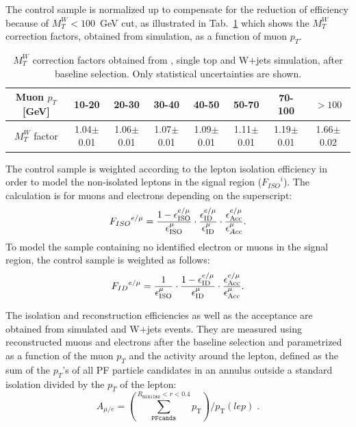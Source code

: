 The control sample is normalized up to compensate for the reduction of efficiency because of $M_{T}^{W}<100$~GeV cut, as illustrated in Tab.~\ref{tab:mtw} which shows the $M_{T}^{W}$ correction factors, obtained from simulation, as a function of muon $p_{T}$. 

\begin{table}[htbp]
\fontsize{10 pt}{1.2 em}
\caption{$M_{T}^{W}$ correction factors obtained from \ttbar, single top and W$+$jets simulation, after baseline selection. Only statistical uncertainties are shown.}
\begin{center}
\begin{tabular}{|c|c|c|c|c|c|c|c|}
\hline
\specialcell{Muon \\ $p_T$ [GeV]} & 10-20 & 20-30 & 30-40 & 40-50 & 50-70 & 70-100 & $>100$ \\
\hline
\specialcell{$M_{T}^{W}$ \\ factor} & 1.04$\pm$0.01 & 1.06$\pm$0.01 & 1.07$\pm$0.01 & 1.09$\pm$0.01 & 1.11$\pm$0.01 & 1.19$\pm$0.01 & 1.66$\pm$0.02 \\
\hline
\end{tabular}
\end{center}
\label{tab:mtw}
\end{table}

The control sample is weighted according to the lepton isolation efficiency in order to model the non-isolated leptons in the signal region (${F_{ISO}}^{i}$). 
The calculation is for muons and electrons depending on the superscript:
\begin{equation}
{F_{ISO}}^{e/\mu} =  \frac{1-\epsilon_{\rm ISO}^{e/\mu}}{\epsilon_{\rm ISO}^{\mu}} \cdot \frac{\epsilon^{e/\mu}_{\rm ID}}{\epsilon^{\mu}_{\rm ID}} \cdot \frac{\epsilon^{e/\mu}_{\rm Acc}}{\epsilon^{\mu}_{Acc}}.
\label{eq:isolation}
\end{equation}
To model the sample containing no identified electron or muons in the signal region, the control sample is weighted as follows:
\begin{equation}
{F_{ID}}^{e/\mu} = \frac{1}{\epsilon_{\rm ISO}^{\mu}}\cdot \frac{1-\epsilon_{\rm ID}^{e/\mu}}{\epsilon_{\rm ID}^{\mu}}  \cdot \frac{\epsilon^{e/\mu}_{\rm Acc}}{\epsilon^{\mu}_{\rm Acc}}.
\label{eq:id}
\end{equation}

The isolation and reconstruction efficiencies as well as the acceptance are obtained from simulated \ttbar and W$+$jets events. They are measured using reconstructed muons and electrons after the baseline selection and parametrized as a function of the muon $p_T$ and the activity around the lepton, defined as the sum of the $p_{T}$'s of all PF particle candidates in an annulus outside a standard isolation divided by the $p_T$ of the lepton:
\begin{equation}
\textit{$A_{\mu/e}$}=\left(\sum^{R_\texttt{miniIso}<r<0.4}_\texttt{PFcands} p_\text{T}\right) / p_\text{T}(lep) \; .
\label{eq:activity}
\end{equation}

